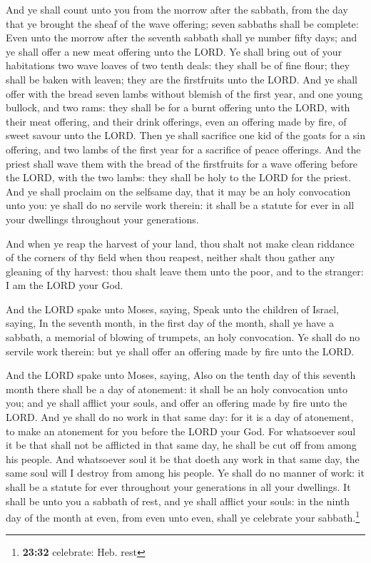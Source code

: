  And ye shall count unto you from the morrow after the
sabbath, from the day that ye brought the sheaf of the wave offering;
seven sabbaths shall be complete:  Even unto the morrow
after the seventh sabbath shall ye number fifty days; and ye shall offer
a new meat offering unto the LORD.  Ye shall bring out of
your habitations two wave loaves of two tenth deals: they shall be of
fine flour; they shall be baken with leaven; they are the firstfruits
unto the LORD.  And ye shall offer with the bread seven
lambs without blemish of the first year, and one young bullock, and two
rams: they shall be for a burnt offering unto the LORD, with their meat
offering, and their drink offerings, even an offering made by fire, of
sweet savour unto the LORD.  Then ye shall sacrifice one
kid of the goats for a sin offering, and two lambs of the first year for
a sacrifice of peace offerings.  And the priest shall
wave them with the bread of the firstfruits for a wave offering before
the LORD, with the two lambs: they shall be holy to the LORD for the
priest.  And ye shall proclaim on the selfsame day, that
it may be an holy convocation unto you: ye shall do no servile work
therein: it shall be a statute for ever in all your dwellings throughout
your generations.

 And when ye reap the harvest of your land, thou shalt
not make clean riddance of the corners of thy field when thou reapest,
neither shalt thou gather any gleaning of thy harvest: thou shalt leave
them unto the poor, and to the stranger: I am the LORD your God.

 And the LORD spake unto Moses, saying, 
Speak unto the children of Israel, saying, In the seventh month, in the
first day of the month, shall ye have a sabbath, a memorial of blowing
of trumpets, an holy convocation.  Ye shall do no servile
work therein: but ye shall offer an offering made by fire unto the LORD.

 And the LORD spake unto Moses, saying, 
Also on the tenth day of this seventh month there shall be a day of
atonement: it shall be an holy convocation unto you; and ye shall
afflict your souls, and offer an offering made by fire unto the LORD.
 And ye shall do no work in that same day: for it is a
day of atonement, to make an atonement for you before the LORD your God.
 For whatsoever soul it be that shall not be afflicted in
that same day, he shall be cut off from among his people.
 And whatsoever soul it be that doeth any work in that
same day, the same soul will I destroy from among his people.
 Ye shall do no manner of work: it shall be a statute for
ever throughout your generations in all your dwellings. 
It shall be unto you a sabbath of rest, and ye shall afflict your souls:
in the ninth day of the month at even, from even unto even, shall ye
celebrate your sabbath.\footnote{\textbf{23:32} celebrate: Heb. rest}

